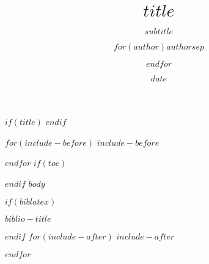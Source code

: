 \documentclass[$if(fontsize)$$fontsize$,$endif$$if(lang)$$babel-lang$,$endif$$if(handout)$handout,$endif$$if(beamer)$ignorenonframetext,$endif$$for(classoption)$$classoption$$sep$,$endfor$$if(make149)$,aspectratio=149$endif$]{$documentclass$}
\title{$title$}
\subtitle{$subtitle$}
\author{$for(author)$$author$$sep$ \and $endfor$}
\date{$date$}
\begin{document}
$if(title)$
\frame{\titlepage}
$endif$

$for(include-before)$
$include-before$

$endfor$
$if(toc)$
\begin{frame}
  \tableofcontents[hideallsubsections]
\end{frame}

$endif$
$body$

$if(biblatex)$
\begin{frame}[allowframebreaks]{$biblio-title$}
  \printbibliography[heading=none]
\end{frame}

$endif$
$for(include-after)$
$include-after$

$endfor$

\end{document}

